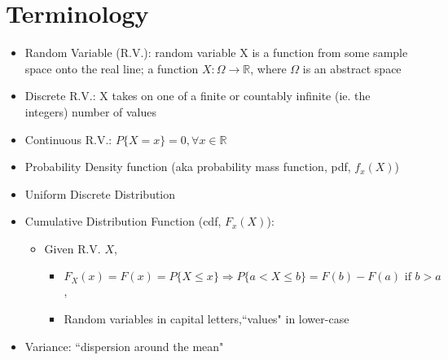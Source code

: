 \documentclass[10pt, oneside]{article}
\newcommand{\R}{\mathbb{R}}
\begin{document}
\section{Terminology}
\begin{itemize}
    \item Random Variable (R.V.): random variable X is a function from some sample space onto the real line; a function $X: \Omega \rightarrow \R$, where $\Omega$ is an abstract space
    \item Discrete R.V.: X takes on one of a finite or countably infinite (ie. the integers) number of values
    \item Continuous R.V.: $P\{X=x\}=0, \forall x \in \R$
    \item Probability Density function (aka probability mass function, pdf, $f_x(X)$)
    \item Uniform Discrete Distribution
    \item Cumulative Distribution Function (cdf, $F_x(X)$): 
    \begin{itemize}
        \item Given R.V. $X$, 
        \begin{itemize}
            \item $F_X(x) = F(x)=P\{X\leq x\}\Rightarrow P\{a<X\leq b\}=F(b)-F(a) \text{ if } b> a$, 
            \item Random variables in capital letters,``values" in lower-case
        \end{itemize}
        
    \end{itemize}
    \item Variance: ``dispersion around the mean"
\end{itemize}
\end{document}

